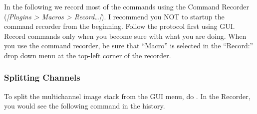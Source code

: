 In the following we record most of the commands using the Command Recorder (\textit{[Plugins > Macros > Record\ldots]}). I recommend you NOT to startup the command recorder from the beginning. Follow the protocol first using GUI. Record commands only when you become sure with what you are doing. When you use the command recorder, be sure that ``Macro'' is selected in the ``Record:'' drop down menu at the top-left corner of the recorder.

\subsubsection{Splitting Channels}

To split the multichannel image stack from the GUI menu, do . In the Recorder, you would see the following command in the history.